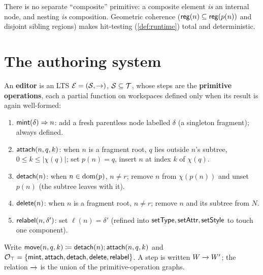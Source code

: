 \documentclass[../uxoxo-main]{subfiles}
\begin{document}
\begin{remark}\label{rem:composition}
There is no separate ``composite'' primitive: a composite element \emph{is} an
internal node, and nesting \emph{is} composition. Geometric coherence
($\mathsf{reg}(n)\subseteq\mathsf{reg}(p(n))$ and disjoint sibling regions) makes hit-testing
(\cref{def:runtime}) total and deterministic.
\end{remark}

\section{The authoring system}\label{sec:authoring}
\begin{definition}[Editor]\label{def:editor}
An \textbf{editor} is an LTS $\mathcal{E}=(\mathcal S,\to)$, $\mathcal S\subseteq\mathcal{T}$,
whose steps are the \textbf{primitive operations}, each a partial function on
workspaces defined only when its result is again well-formed:
\begin{enumerate}[label=\textup{(\arabic*)}, leftmargin=*, itemsep=1pt]
  \item $\mathsf{mint}(\delta)\Rightarrow n$: add a fresh parentless node labelled
        $\delta$ (a singleton fragment); always defined.
  \item $\mathsf{attach}(n,q,k)$: when $n$ is a fragment root, $q$ lies outside $n$'s
        subtree, $0\le k\le\lvert\chi(q)\rvert$; set $p(n)=q$, insert $n$ at
        index $k$ of $\chi(q)$.
  \item $\mathsf{detach}(n)$: when $n\in\operatorname{dom}(p)$, $n\ne r$; remove $n$ from $\chi(p(n))$
        and unset $p(n)$ (the subtree leaves with it).
  \item $\mathsf{delete}(n)$: when $n$ is a fragment root, $n\ne r$; remove $n$ and its
        subtree from $N$.
  \item $\mathsf{relabel}(n,\delta')$: set $\ell(n)=\delta'$ (refined into
        $\mathsf{setType},\mathsf{setAttr},\mathsf{setStyle}$ to touch one component).
\end{enumerate}
Write $\mathsf{move}(n,q,k)\coloneqq\mathsf{detach}(n);\mathsf{attach}(n,q,k)$ and
$\mathcal{O}_\top=\{\mathsf{mint},\mathsf{attach},\mathsf{detach},\mathsf{delete},\mathsf{relabel}\}$. A step is written
$W\xrightarrow{\,\,}W'$; the relation $\xrightarrow{\,\,}$ is the union of the primitive-operation
graphs.
\end{definition}
\end{document}
